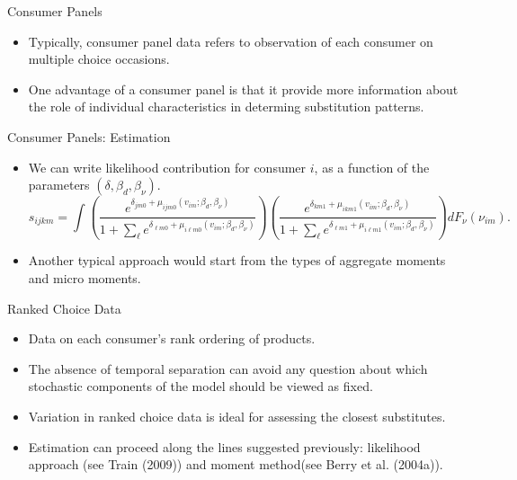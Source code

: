 \documentclass[aspectratio=169]{beamer}  %
\begin{document}
\begin{frame}{Consumer Panels}
    \begin{itemize}
        \item Typically, consumer panel data refers to observation of each consumer on multiple choice occasions.
        \item One advantage of a consumer panel is that it provide more information about the role of individual characteristics in determing substitution patterns.
    \end{itemize}
\end{frame}

\begin{frame}{Consumer Panels: Estimation}
    \begin{itemize}
    \item
    We can write likelihood contribution for consumer \(i\), as a function of the parameters \((\delta, \beta_d, \beta_\nu)\).
    \begin{equation}
        s_{ijk m} = \int \left( \frac{e^{\delta_{j m 0} + \mu_{i j m 0}(v_{i m}; \beta_d, \beta_\nu)}}{1 + \sum_\ell e^{\delta_{\ell m 0} + \mu_{i \ell m 0}(v_{i m}; \beta_d, \beta_\nu)}} \right) \left( \frac{e^{\delta_{k m 1} + \mu_{i k m 1}(v_{i m}; \beta_d, \beta_\nu)}}{1 + \sum_\ell e^{\delta_{\ell m 1} + \mu_{i \ell m 1}(v_{i m}; \beta_d, \beta_\nu)}} \right) dF_\nu(\nu_{i m}).
    \end{equation}
    \item Another typical approach would start from the types of aggregate moments and micro moments.
    \end{itemize}
\end{frame}

\begin{frame}{Ranked Choice Data}
    \begin{itemize}
        \item Data on each consumer’s rank ordering of products.
        \item The absence of temporal separation can avoid any question about which stochastic components of the model should be viewed as fixed.
        \item Variation in ranked choice data is ideal for assessing the closest substitutes.
        \item Estimation can proceed along the lines suggested previously: likelihood approach (see Train (2009)) and moment method(see Berry et al. (2004a)).
    \end{itemize}
\end{frame}
\end{document}

